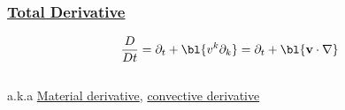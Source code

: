 %
\begin{frame}\frametitle{\href{https://mathworld.wolfram.com/TotalDerivative.html}{Total Derivative}}
\begin{equation}
	\frac{D}{Dt} = \partial_{t} + \bl{v^{k}\partial_{k}} = \partial_{t} + \bl{\mathbf{v} \cdot \nabla}	
\label{eq:total derivative}
\end{equation}
\ \\[20pt]
a.k.a \href{https://en.wikipedia.org/wiki/Material_derivative}{Material derivative}, \href{https://mathworld.wolfram.com/ConvectiveDerivative.html}{convective derivative}
%
\end{frame}
%
%
